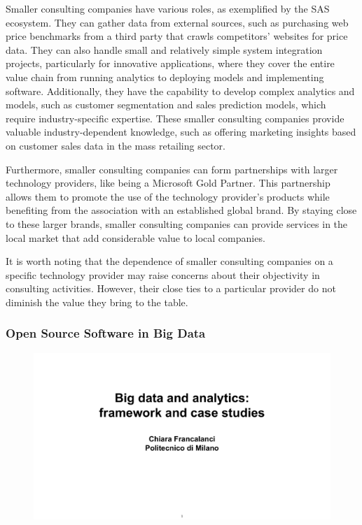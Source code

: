 Smaller consulting companies have various roles, as exemplified by the
SAS ecosystem. They can gather data from external sources, such as
purchasing web price benchmarks from a third party that crawls
competitors' websites for price data. They can also handle small and
relatively simple system integration projects, particularly for
innovative applications, where they cover the entire value chain from
running analytics to deploying models and implementing software.
Additionally, they have the capability to develop complex analytics and
models, such as customer segmentation and sales prediction models, which
require industry-specific expertise. These smaller consulting companies
provide valuable industry-dependent knowledge, such as offering
marketing insights based on customer sales data in the mass retailing
sector.

Furthermore, smaller consulting companies can form partnerships with
larger technology providers, like being a Microsoft Gold Partner. This
partnership allows them to promote the use of the technology provider's
products while benefiting from the association with an established
global brand. By staying close to these larger brands, smaller
consulting companies can provide services in the local market that add
considerable value to local companies.

It is worth noting that the dependence of smaller consulting companies
on a specific technology provider may raise concerns about their
objectivity in consulting activities. However, their close ties to a
particular provider do not diminish the value they bring to the table.

\subsubsection{Open Source Software in Big Data}

\begin{figure}[!h]
  \centering
  \includegraphics[page=62, trim = 1cm 5cm 1cm 4.5cm, clip, width=\imagewidth]{images/06 - BIG_DATA.pdf}
\end{figure}

